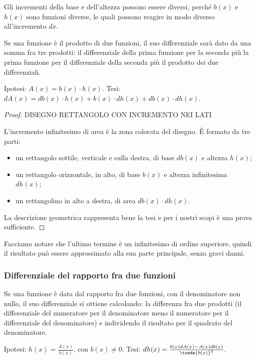 \begin{osservazione}
Gli incrementi della base e dell'altezza possono essere 
diversi, perché $b(x)$ e $h(x)$ sono funzioni diverse, le quali possono
reagire in modo diverso all'incremento $dx$.
\end{osservazione}

\begin{teorema}
 Se una funzione è il prodotto di due funzioni, il suo  differenziale 
 sarà dato da una somma fra tre prodotti: il differenziale della
 prima funzione per la seconda più la prima funzione per il differenziale 
 della seconda più il prodotto dei due differenziali.
\end{teorema}
\noindent Ipotesi: $\mathit{A}(x)=b(x)\cdot h(x)$.\qquad 
Tesi: $d\mathit{A}(x)=db(x)\cdot h(x)+b(x)\cdot dh(x)+ db(x)\cdot dh(x)$.

\begin{proof}


DISEGNO RETTANGOLO CON INCREMENTO NEI LATI

L'incremento infinitesimo di area è la zona colorata del disegno. È 
formato da tre parti:
\begin{itemize} [noitemsep]
 \item un rettangolo sottile, verticale e sulla destra, di base $db(x)$ e altezza $h(x)$;
 \item un rettangolo orizzontale, in alto, di base $b(x)$ e altezza infinitesima $dh(x)$;
 \item un rettangolino in alto a destra, di area $db(x)\cdot dh(x)$.
\end{itemize}
La descrizione geometrica rappresenta bene la tesi e per i nostri scopi è
una prova sufficiente. 
\end{proof}
Facciamo notare che l'ultimo termine è un infinitesimo di ordine
superiore, quindi il risultato può essere approssimato alla sua parte principale, 
senza gravi danni.

\subsubsection{Differenziale del rapporto fra due funzioni}
\label{}
\begin{teorema}
 Se una funzione è data dal rapporto fra due funzioni, con il denominatore
 non nullo, il suo  differenziale si ottiene calcolando:
 la differenza fra due prodotti (il differenziale del numeratore per il 
 denominatore meno il numeratore per il differenziale del denominatore)
 e individendo il risultato per il quadrato del denominatore.
\end{teorema}
\noindent Ipotesi: $h(x)=\frac{\mathit{A}(x)}{b(x)}$, con $b(x)\neq 0$.\tab 
Tesi: $dh(x)=\frac{b(x)d\mathit{A}(x)-\mathit{A}(x)db(x)}{\tonda{b(x)}^2}$.

